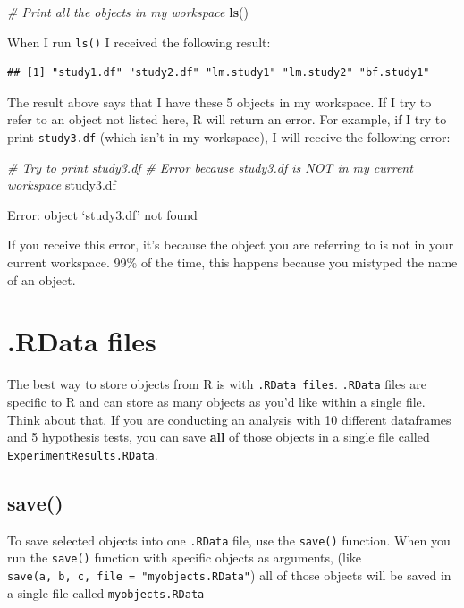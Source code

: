 \documentclass[]{book}
\newenvironment{Shaded}{\begin{snugshade}}{\end{snugshade}}
\newcommand{\KeywordTok}[1]{\textcolor[rgb]{0.13,0.29,0.53}{\textbf{#1}}}
\newcommand{\CommentTok}[1]{\textcolor[rgb]{0.56,0.35,0.01}{\textit{#1}}}
\newcommand{\NormalTok}[1]{#1}
\theoremstyle{definition}
\theoremstyle{definition}
\theoremstyle{remark}
\begin{document}
\begin{Shaded}
\begin{Highlighting}[]
\CommentTok{# Print all the objects in my workspace}
\KeywordTok{ls}\NormalTok{()}
\end{Highlighting}
\end{Shaded}

When I run \texttt{ls()} I received the following result:

\begin{verbatim}
## [1] "study1.df" "study2.df" "lm.study1" "lm.study2" "bf.study1"
\end{verbatim}

The result above says that I have these 5 objects in my workspace. If I
try to refer to an object not listed here, R will return an error. For
example, if I try to print \texttt{study3.df} (which isn't in my
workspace), I will receive the following error:

\begin{Shaded}
\begin{Highlighting}[]
\CommentTok{# Try to print study3.df}
\CommentTok{#  Error because study3.df is NOT in my current workspace}
\NormalTok{study3.df}
\end{Highlighting}
\end{Shaded}

Error: object `study3.df' not found

If you receive this error, it's because the object you are referring to
is not in your current workspace. 99\% of the time, this happens because
you mistyped the name of an object.

\section{.RData files}\label{rdata-files}

The best way to store objects from R is with \texttt{.RData\ files}.
\texttt{.RData} files are specific to R and can store as many objects as
you'd like within a single file. Think about that. If you are conducting
an analysis with 10 different dataframes and 5 hypothesis tests, you can
save \textbf{all} of those objects in a single file called
\texttt{ExperimentResults.RData}.

\subsection{save()}\label{save}

To save selected objects into one \texttt{.RData} file, use the
\texttt{save()} function. When you run the \texttt{save()} function with
specific objects as arguments, (like
\texttt{save(a,\ b,\ c,\ file\ =\ "myobjects.RData"}) all of those
objects will be saved in a single file called \texttt{myobjects.RData}
\end{document}
